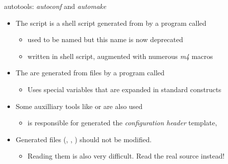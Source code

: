 \begin{frame}{autotools: {\em autoconf} and {\em automake}}
  \begin{itemize}
  \item The  script is a shell script generated from
     by a program called 
    \begin{itemize}
    \item {} used to be named  but
      this name is now deprecated
    \item written in shell script, augmented with numerous {\em m4}
      macros
    \end{itemize}
  \item The  are generated from 
    files by a program called 
    \begin{itemize}
    \item Uses special  variables that are expanded in
      standard  constructs
    \end{itemize}
  \item Some auxilliary tools like  or 
    are also used
    \begin{itemize}
    \item {} is responsible for generated the {\em
        configuration header} template, 
    \end{itemize}
  \item Generated files (, ,
    ) should not be modified.
    \begin{itemize}
    \item Reading them is also very difficult. Read the real source
      instead!
    \end{itemize}
  \end{itemize}
\end{frame}

